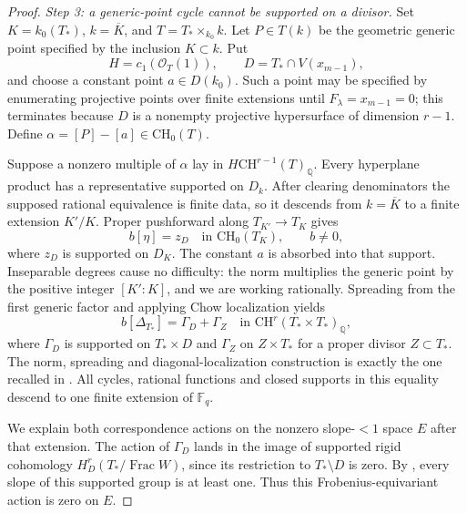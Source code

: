 \begin{proof}
\emph{Step 3: a generic-point cycle cannot be supported on a divisor.}
Set $K=k_0(T_*)$, $k=\overline K$, and $T=T_*\times_{k_0}k$.
Let $P\in T(k)$ be the geometric generic point specified by the
inclusion $K\subset k$. Put
\[
 H=c_1(\mathcal O_T(1)),\qquad
 D=T_*\cap V(x_{m-1}),
\]
and choose a constant point $a\in D(k_0)$. Such a point may be
specified by enumerating projective points over finite extensions until
$F_\lambda=x_{m-1}=0$; this terminates because $D$ is a nonempty
projective hypersurface of dimension $r-1$. Define
$\alpha=[P]-[a]\in\mathrm{CH}_0(T)$.

Suppose a nonzero multiple of $\alpha$ lay in
$H\mathrm{CH}^{r-1}(T)_{\mathbb Q}$. Every hyperplane product has a
representative supported on $D_k$. After clearing denominators the
supposed rational equivalence is finite data, so it descends from
$k=\overline K$ to a finite extension $K'/K$. Proper pushforward
along $T_{K'}\to T_K$ gives
\[
                 b[\eta]=z_D\quad\text{in }\mathrm{CH}_0(T_K),
                 \qquad b\ne0,
\]
where $z_D$ is supported on $D_K$. The constant $a$ is absorbed
into that support. Inseparable degrees cause no difficulty: the norm
multiplies the generic point by the positive integer $[K':K]$, and
we are working rationally. Spreading from the first generic factor
and applying Chow localization yields
\[
 b[\Delta_{T_*}]=\Gamma_D+\Gamma_Z
       \quad\text{in }\mathrm{CH}^r(T_*\times T_*)_{\mathbb Q},
\]
where $\Gamma_D$ is supported on $T_*\times D$ and $\Gamma_Z$
on $Z\times T_*$ for a proper divisor $Z\subset T_*$. The norm,
spreading and diagonal-localization construction is exactly the one
recalled in \citet[Section~1, printed p.~187]{D_Esnault2003}.
All cycles, rational functions and closed supports in this equality
descend to one finite extension of $\mathbb F_q$.

We explain both correspondence actions on the nonzero slope-$<1$
space $E$ after that extension. The action of $\Gamma_D$ lands in
the image of supported rigid cohomology
$H^r_D(T_*/\operatorname{Frac}W)$, since its restriction to
$T_*\setminus D$ is zero. By
\citet[Lemma~2.1 and its proof, printed pp.~189--190]{D_Esnault2003},
every slope of this supported group is at least one. Thus this
Frobenius-equivariant action is zero on $E$.


\end{proof}
